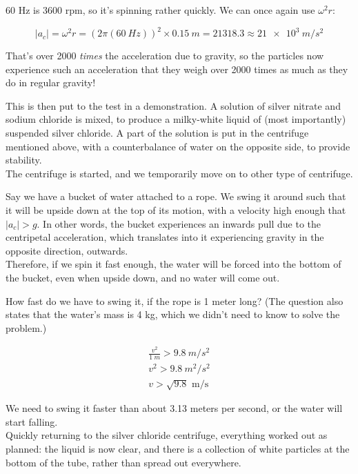 60 Hz is 3600 rpm, so it's spinning rather quickly. We can once again use $\omega^2 r$:

\begin{equation}
|a_c| = \omega^2 r = (2 \pi (\SI{60}{Hz}))^2 \times \SI{0.15}{m} = 21318.3 \approx \SI{21e3}{m/s^2}
\end{equation}

That's over 2000 \emph{times} the acceleration due to gravity, so the particles now experience such an acceleration that they weigh over 2000 times as much as they do in regular gravity!

This is then put to the test in a demonstration. A solution of silver nitrate and sodium chloride is mixed, to produce a milky-white liquid of (most importantly) suspended silver chloride. A part of the solution is put in the centrifuge mentioned above, with a counterbalance of water on the opposite side, to provide stability.\\
The centrifuge is started, and we temporarily move on to other type of centrifuge.

Say we have a bucket of water attached to a rope. We swing it around such that it will be upside down at the top of its motion, with a velocity high enough that $|a_c| > g$. In other words, the bucket experiences an inwards pull due to the centripetal acceleration, which translates into it experiencing gravity in the opposite direction, outwards.\\
Therefore, if we spin it fast enough, the water will be forced into the bottom of the bucket, even when upside down, and no water will come out.

How fast do we have to swing it, if the rope is 1 meter long? (The question also states that the water's mass is 4 kg, which we didn't need to know to solve the problem.)

\begin{align}
\frac{v^2}{\SI{1}{m}} > \SI{9.8}{m/s^2}\\
v^2 > \SI{9.8}{m^2/s^2}\\
v > \sqrt{9.8} \text{ m/s}
\end{align}

We need to swing it faster than about 3.13 meters per second, or the water will start falling.\\
Quickly returning to the silver chloride centrifuge, everything worked out as planned: the liquid is now clear, and there is a collection of white particles at the bottom of the tube, rather than spread out everywhere.


